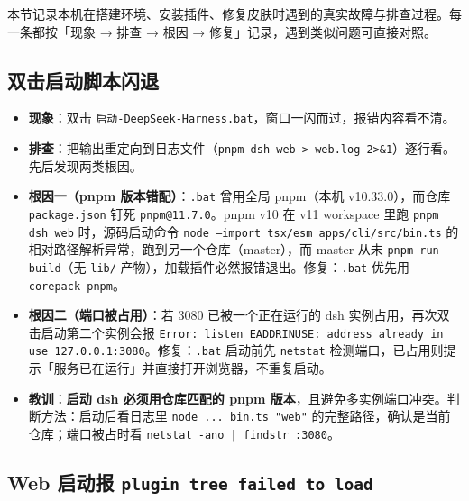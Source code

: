 \documentclass[11pt]{ctexart}
\newcommand{\code}[1]{\texttt{\small #1}}
\begin{document}
本节记录本机在搭建环境、安装插件、修复皮肤时遇到的真实故障与排查过程。每一条都按「现象 → 排查 → 根因 → 修复」记录，遇到类似问题可直接对照。

\subsection{双击启动脚本闪退}

\begin{itemize}[itemsep=2pt]
  \item \textbf{现象}：双击 \code{启动-DeepSeek-Harness.bat}，窗口一闪而过，报错内容看不清。
  \item \textbf{排查}：把输出重定向到日志文件（\code{pnpm dsh web > web.log 2>\&1}）逐行看。先后发现两类根因。
  \item \textbf{根因一（pnpm 版本错配）}：\code{.bat} 曾用全局 pnpm（本机 v10.33.0），而仓库 \code{package.json} 钉死 \code{pnpm@11.7.0}。pnpm v10 在 v11 workspace 里跑 \code{pnpm dsh web} 时，源码启动命令 \code{node --import tsx/esm apps/cli/src/bin.ts} 的相对路径解析异常，跑到另一个仓库（master），而 master 从未 \code{pnpm run build}（无 \code{lib/} 产物），加载插件必然报错退出。修复：\code{.bat} 优先用 \code{corepack pnpm}。
  \item \textbf{根因二（端口被占用）}：若 3080 已被一个正在运行的 dsh 实例占用，再次双击启动第二个实例会报 \code{Error: listen EADDRINUSE: address already in use 127.0.0.1:3080}。修复：\code{.bat} 启动前先 \code{netstat} 检测端口，已占用则提示「服务已在运行」并直接打开浏览器，不重复启动。
  \item \textbf{教训}：\textbf{启动 dsh 必须用仓库匹配的 pnpm 版本}，且避免多实例端口冲突。判断方法：启动后看日志里 \code{node ... bin.ts "web"} 的完整路径，确认是当前仓库；端口被占时看 \code{netstat -ano | findstr :3080}。
\end{itemize}

\subsection{Web 启动报 \code{plugin tree failed to load}}
\label{sec:plugin-tree}
\end{document}
